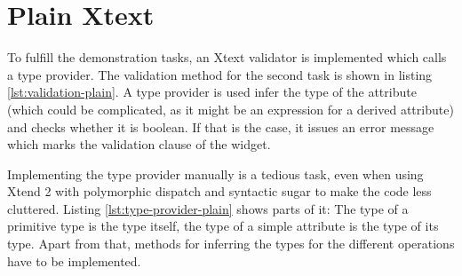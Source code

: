 \section{Plain Xtext}

To fulfill the demonstration tasks, an Xtext validator is implemented which calls a type provider. The validation method for the second task is shown in listing \ref{lst:validation-plain}. A type provider is used infer the type of the attribute (which could be complicated, as it might be an expression for a derived attribute) and checks whether it is boolean. If that is the case, it issues an error message which marks the validation clause of the widget.



Implementing the type provider manually is a tedious task, even when using Xtend 2 with polymorphic dispatch and syntactic sugar to make the code less cluttered. Listing \ref{lst:type-provider-plain} shows parts of it: The type of a primitive type is the type itself, the type of a simple attribute is the type of its type. Apart from that, methods for inferring the types for the different operations have to be implemented.


